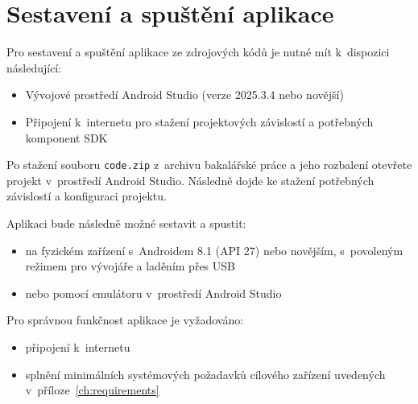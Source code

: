 \chapter{Sestavení a spuštění aplikace}\label{ch:build}
Pro sestavení a spuštění aplikace ze zdrojových kódů je nutné mít k~dispozici následující:

\begin{itemize}
    \item Vývojové prostředí Android Studio (verze 2025.3.4 nebo novější)
    \item Připojení k~internetu pro stažení projektových závislostí a potřebných komponent SDK
\end{itemize}

Po stažení souboru \texttt{code.zip} z~archivu bakalářské práce a jeho rozbalení otevřete projekt v~prostředí Android Studio.
Následně dojde ke stažení potřebných závislostí a konfiguraci projektu.

Aplikaci bude následně možné sestavit a spustit:

\begin{itemize}
    \item na fyzickém zařízení s~Androidem 8.1 (API 27) nebo novějším, s~povoleným režimem pro vývojáře a laděním přes USB
    \item nebo pomocí emulátoru v~prostředí Android Studio
\end{itemize}

Pro správnou funkčnost aplikace je vyžadováno:

\begin{itemize}
    \item připojení k~internetu
    \item splnění minimálních systémových požadavků cílového zařízení uvedených v~příloze~\ref{ch:requirements}
\end{itemize}
